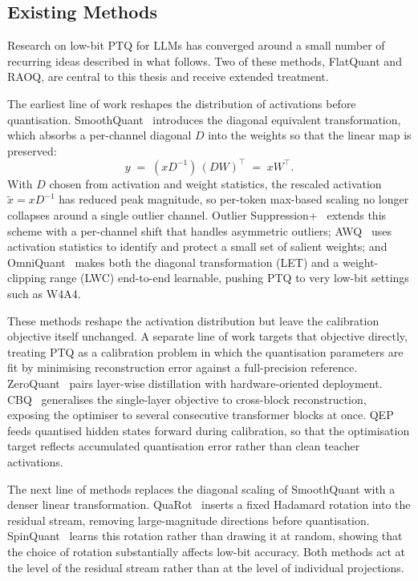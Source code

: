 \documentclass[a4paper,11pt,oneside]{article}
\theoremstyle{breakstyle}
\begin{document}
\subsection{Existing Methods}
\label{subsec:existing_methods}

Research on low-bit PTQ for LLMs has converged around a small number
of recurring ideas described in what follows. Two of these methods,
FlatQuant and RAOQ, are central to this thesis and receive extended
treatment.

The earliest line of work reshapes the distribution of activations
before quantisation. SmoothQuant~\cite{SmoothQuant2022} introduces the
diagonal equivalent transformation, which absorbs a per-channel
diagonal $D$ into the weights so that the linear map is preserved:
\begin{equation}
y \;=\; (x D^{-1})\,(D W)^{\top} \;=\; x W^{\top}.
\label{eq:smoothquant_equivalence}
\end{equation}
With $D$ chosen from activation and weight statistics, the rescaled
activation $\tilde x = x D^{-1}$ has reduced peak magnitude, so
per-token max-based scaling no longer collapses around a single
outlier channel. Outlier Suppression+~\cite{OutlierSuppressionPlus2023}
extends this scheme with a per-channel shift that handles asymmetric
outliers; AWQ~\cite{AWQ2023} uses activation statistics to identify
and protect a small set of salient weights; and
OmniQuant~\cite{OmniQuant2023} makes both the diagonal transformation
(LET) and a weight-clipping range (LWC) end-to-end learnable, pushing
PTQ to very low-bit settings such as W4A4.

These methods reshape the activation distribution but leave the
calibration objective itself unchanged. A separate line of work
targets that objective directly, treating PTQ as a calibration problem
in which the quantisation parameters are fit by minimising
reconstruction error against a full-precision reference.
ZeroQuant~\cite{ZeroQuant2022} pairs layer-wise distillation with
hardware-oriented deployment. CBQ~\cite{CBQ2023} generalises the
single-layer objective to cross-block reconstruction, exposing the
optimiser to several consecutive transformer blocks at once.
QEP~\cite{QEP2025} feeds quantised hidden states forward during
calibration, so that the optimisation target reflects accumulated
quantisation error rather than clean teacher activations.

The next line of methods replaces the diagonal scaling of SmoothQuant
with a denser linear transformation. QuaRot~\cite{QuaRot2024} inserts
a fixed Hadamard rotation into the residual stream, removing
large-magnitude directions before quantisation.
SpinQuant~\cite{SpinQuant2024} learns this rotation rather than
drawing it at random, showing that the choice of rotation
substantially affects low-bit accuracy. Both methods act at the level
of the residual stream rather than at the level of individual
projections.
\end{document}
